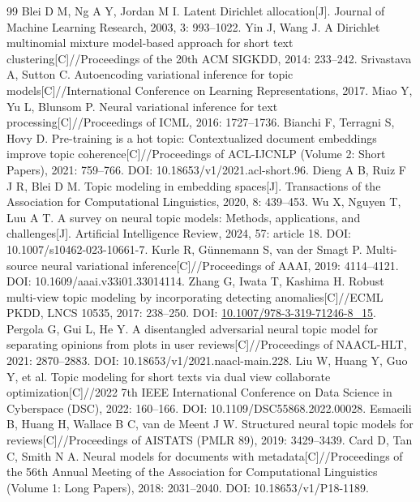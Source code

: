 \documentclass[11pt]{article}
\begin{document}
\begin{thebibliography}{99}
 Blei D M, Ng A Y, Jordan M I. Latent Dirichlet allocation[J]. Journal of Machine Learning Research, 2003, 3: 993--1022.
 Yin J, Wang J. A Dirichlet multinomial mixture model-based approach for short text clustering[C]//Proceedings of the 20th ACM SIGKDD, 2014: 233--242.
 Srivastava A, Sutton C. Autoencoding variational inference for topic models[C]//International Conference on Learning Representations, 2017.
 Miao Y, Yu L, Blunsom P. Neural variational inference for text processing[C]//Proceedings of ICML, 2016: 1727--1736.
 Bianchi F, Terragni S, Hovy D. Pre-training is a hot topic: Contextualized document embeddings improve topic coherence[C]//Proceedings of ACL-IJCNLP (Volume 2: Short Papers), 2021: 759--766. DOI: 10.18653/v1/2021.acl-short.96.
 Dieng A B, Ruiz F J R, Blei D M. Topic modeling in embedding spaces[J]. Transactions of the Association for Computational Linguistics, 2020, 8: 439--453.
 Wu X, Nguyen T, Luu A T. A survey on neural topic models: Methods, applications, and challenges[J]. Artificial Intelligence Review, 2024, 57: article 18. DOI: 10.1007/s10462-023-10661-7.
 Kurle R, G\"unnemann S, van der Smagt P. Multi-source neural variational inference[C]//Proceedings of AAAI, 2019: 4114--4121. DOI: 10.1609/aaai.v33i01.33014114.
 Zhang G, Iwata T, Kashima H. Robust multi-view topic modeling by incorporating detecting anomalies[C]//ECML PKDD, LNCS 10535, 2017: 238--250. DOI: \url{10.1007/978-3-319-71246-8_15}.
 Pergola G, Gui L, He Y. A disentangled adversarial neural topic model for separating opinions from plots in user reviews[C]//Proceedings of NAACL-HLT, 2021: 2870--2883. DOI: 10.18653/v1/2021.naacl-main.228.
 Liu W, Huang Y, Guo Y, et al. Topic modeling for short texts via dual view collaborate optimization[C]//2022 7th IEEE International Conference on Data Science in Cyberspace (DSC), 2022: 160--166. DOI: 10.1109/DSC55868.2022.00028.
 Esmaeili B, Huang H, Wallace B C, van de Meent J W. Structured neural topic models for reviews[C]//Proceedings of AISTATS (PMLR 89), 2019: 3429--3439.
 Card D, Tan C, Smith N A. Neural models for documents with metadata[C]//Proceedings of the 56th Annual Meeting of the Association for Computational Linguistics (Volume 1: Long Papers), 2018: 2031--2040. DOI: 10.18653/v1/P18-1189.

\end{thebibliography}
\end{document}
